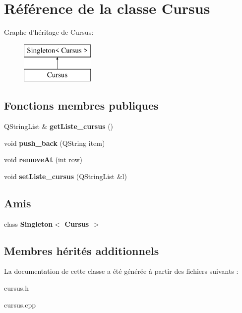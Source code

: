 \hypertarget{class_cursus}{\section{Référence de la classe Cursus}
\label{class_cursus}
}
Graphe d'héritage de Cursus\+:\begin{figure}[H]
\begin{center}
\leavevmode
\includegraphics[height=2.000000cm]{class_cursus}
\end{center}
\end{figure}
\subsection*{Fonctions membres publiques}
\begin{DoxyCompactItemize}
\item 
\hypertarget{class_cursus_ab66bff51a6422dcb2342fe94fd8062f5}{Q\+String\+List \& {\bfseries get\+Liste\+\_\+cursus} ()}\label{class_cursus_ab66bff51a6422dcb2342fe94fd8062f5}

\item 
\hypertarget{class_cursus_ae64961c683e50fd22deb9a9242094407}{void {\bfseries push\+\_\+back} (Q\+String item)}\label{class_cursus_ae64961c683e50fd22deb9a9242094407}

\item 
\hypertarget{class_cursus_a50e8abb051af0a937fec5a95fd598ba7}{void {\bfseries remove\+At} (int row)}\label{class_cursus_a50e8abb051af0a937fec5a95fd598ba7}

\item 
\hypertarget{class_cursus_a938c8831a597dbeef047958ed614c0fb}{void {\bfseries set\+Liste\+\_\+cursus} (Q\+String\+List \&l)}\label{class_cursus_a938c8831a597dbeef047958ed614c0fb}

\end{DoxyCompactItemize}
\subsection*{Amis}
\begin{DoxyCompactItemize}
\item 
\hypertarget{class_cursus_a39488d3df381e1f57721cebe5054e4d3}{class {\bfseries Singleton$<$ Cursus $>$}}\label{class_cursus_a39488d3df381e1f57721cebe5054e4d3}

\end{DoxyCompactItemize}
\subsection*{Membres hérités additionnels}


La documentation de cette classe a été générée à partir des fichiers suivants \+:\begin{DoxyCompactItemize}
\item 
cursus.\+h\item 
cursus.\+cpp\end{DoxyCompactItemize}
